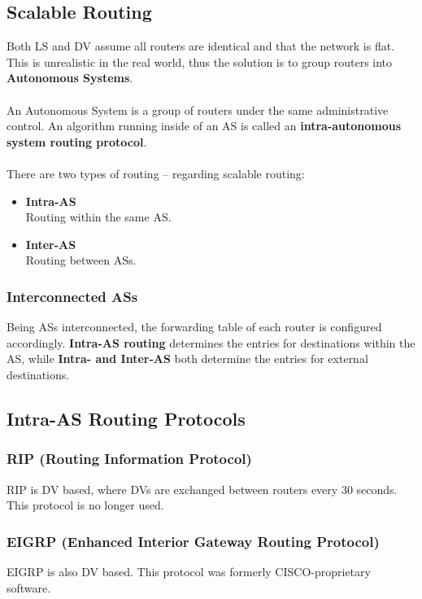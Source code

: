 \documentclass{article}
\begin{document}
\subsection{Scalable Routing}
Both LS and DV assume all routers are identical and that the network is flat. This is unrealistic in the real world, thus the solution is to group routers into \textbf{Autonomous Systems}. \\ \\
An Autonomous System is a group of routers under the same administrative control. An algorithm running inside of an AS is called an \textbf{intra-autonomous system routing protocol}. \\ \\
There are two types of routing -- regarding scalable routing:
\begin{itemize}
	\item \textbf{Intra-AS}
	\vspace{.2cm} \\
	Routing within the same AS.
	
	\item \textbf{Inter-AS}
	\vspace{.2cm} \\
	Routing between ASs.
\end{itemize}

\subsubsection{Interconnected ASs}
Being ASs interconnected, the forwarding table of each router is configured accordingly. \textbf{Intra-AS routing} determines the entries for destinations within the AS, while \textbf{Intra- and Inter-AS} both determine the entries for external destinations.

\subsection{Intra-AS Routing Protocols}

\subsubsection{RIP (Routing Information Protocol)}
RIP is DV based, where DVs are exchanged between routers every 30 seconds. This protocol is no longer used.

\subsubsection{EIGRP (Enhanced Interior Gateway Routing Protocol)}
EIGRP is also DV based. This protocol was formerly CISCO-proprietary software.
\end{document}
